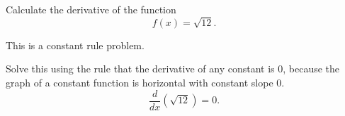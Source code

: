 \documentclass{ximera}
\author{Emma Smith Zbarsky}
\begin{document}
\begin{exercise}

Calculate the derivative of the function \[f(x) = \sqrt{12}.\]


\begin{hint}
This is a constant rule problem.
\end{hint}


\begin{hint}
Solve this using the rule that the derivative of any constant is 0,
because the graph of a constant function is horizontal with constant
slope 0. \[ \frac{d}{dx}(\sqrt{12}) = \boxed{0}.\]
\end{hint}


\begin{multipleChoice}
\end{multipleChoice}

\end{exercise}
\end{document}
